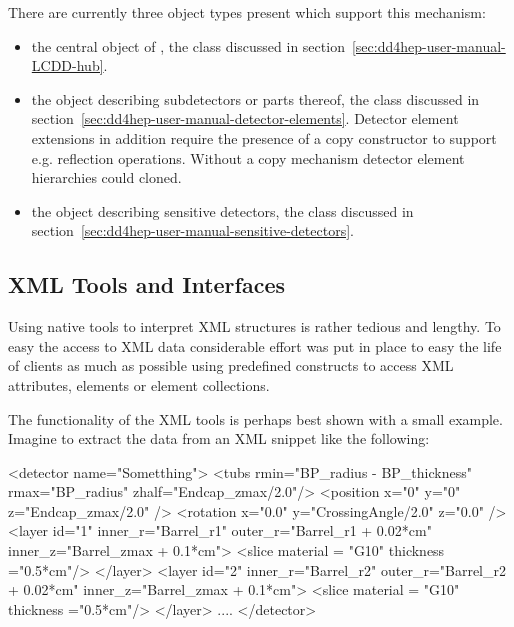\documentclass[10pt,a4paper]{article}
\begin{document}
\noindent
There are currently three object types present which support this mechanism:
\begin{itemize}\itemcompact
\item the central object of \DDhep, the  class discussed in 
        section~\ref{sec:dd4hep-user-manual-LCDD-hub}.
\item the object describing subdetectors or parts thereof, the 
         class discussed in 
        section~\ref{sec:dd4hep-user-manual-detector-elements}.
        Detector element extensions in addition require the presence 
        of a copy constructor to support e.g. reflection operations.
        Without a copy mechanism detector element hierarchies could 
        cloned.
\item the object describing sensitive detectors, 
       the  class discussed in 
       section~\ref{sec:dd4hep-user-manual-sensitive-detectors}.
\end{itemize}


\newpage
\subsection{XML Tools and Interfaces}
\label{sec:dd4hep-user-manual-xml-tools}
\noindent
Using native tools to interpret XML structures is rather tedious and lengthy.
To easy the access to XML data considerable effort was put in place to easy
the life of clients as much as possible using predefined constructs to 
access XML attributes, elements or element collections.

\noindent 
The functionality of the XML tools is perhaps best shown with a small example.
Imagine to extract the data from an XML snippet like the following:
\begin{code}
  <detector name="Sometthing">
    <tubs rmin="BP_radius - BP_thickness" rmax="BP_radius" zhalf="Endcap_zmax/2.0"/>
    <position x="0" y="0" z="Endcap_zmax/2.0" />
    <rotation x="0.0" y="CrossingAngle/2.0" z="0.0" />
    <layer id="1" inner_r="Barrel_r1" 
    	   outer_r="Barrel_r1 + 0.02*cm" inner_z="Barrel_zmax + 0.1*cm">
      <slice material = "G10" thickness ="0.5*cm"/>
    </layer>
    <layer id="2" inner_r="Barrel_r2" 
	   outer_r="Barrel_r2 + 0.02*cm" inner_z="Barrel_zmax + 0.1*cm">
     <slice material = "G10" thickness ="0.5*cm"/>
    </layer>
    ....
  </detector>
\end{code}
\end{document}
